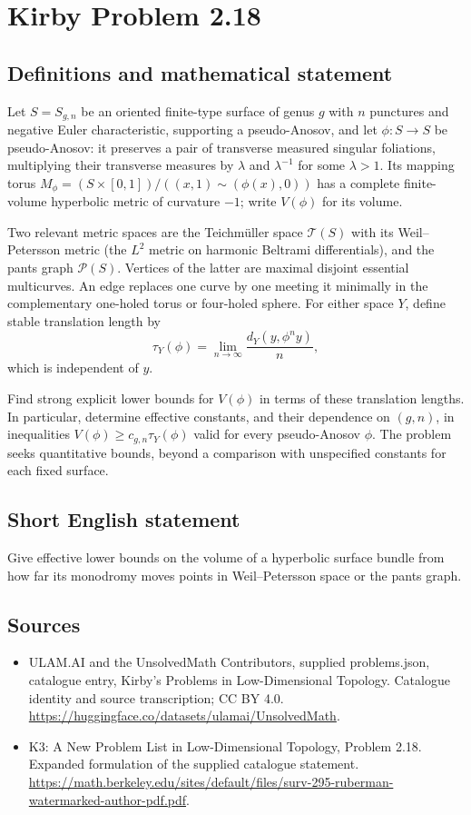 \documentclass[11pt,a4paper]{article}
\begin{document}
\section*{Kirby Problem 2.18}\label{statement}

\subsection{Definitions and mathematical statement}
Let $S=S_{g,n}$ be an oriented finite-type surface of genus $g$ with $n$
punctures and negative Euler characteristic, supporting a pseudo-Anosov, and let
$\phi:S\to S$ be pseudo-Anosov: it preserves a pair of transverse measured
singular foliations, multiplying their transverse measures by $\lambda$ and
$\lambda^{-1}$ for some $\lambda>1$. Its mapping torus
$M_\phi=(S\times[0,1])/((x,1)\sim(\phi(x),0))$ has a complete finite-volume
hyperbolic metric of curvature $-1$; write $V(\phi)$ for its volume.

Two relevant metric spaces are the Teichmüller space $\mathcal T(S)$ with its
Weil--Petersson metric (the $L^2$ metric on harmonic Beltrami differentials),
and the pants graph $\mathcal P(S)$. Vertices of the latter are maximal
disjoint essential multicurves. An edge replaces one curve by one meeting it
minimally in the complementary one-holed torus or four-holed sphere.
For either space $Y$, define stable translation length by
\[
 \tau_Y(\phi)=\lim_{n\to\infty}\frac{d_Y(y,\phi^n y)}n,
\]
which is independent of $y$.

Find strong explicit lower bounds for $V(\phi)$ in terms of these translation
lengths. In particular, determine effective constants, and their dependence
on $(g,n)$, in inequalities $V(\phi)\geq c_{g,n}\tau_Y(\phi)$ valid for every
pseudo-Anosov $\phi$. The problem seeks quantitative bounds, beyond a
comparison with unspecified constants for each fixed surface.
\subsection{Short English statement}
Give effective lower bounds on the volume of a hyperbolic surface bundle from how far its monodromy moves points in Weil--Petersson space or the pants graph.
\subsection{Sources}
\begin{itemize}
\item[S1] ULAM.AI and the UnsolvedMath Contributors, supplied problems.json, catalogue entry, Kirby's Problems in Low-Dimensional Topology. Catalogue identity and source transcription; CC BY 4.0.
\url{https://huggingface.co/datasets/ulamai/UnsolvedMath}.
\item[S2] K3: A New Problem List in Low-Dimensional Topology, Problem 2.18. Expanded formulation of the supplied catalogue statement.
\url{https://math.berkeley.edu/sites/default/files/surv-295-ruberman-watermarked-author-pdf.pdf}.
\end{itemize}
\end{document}
